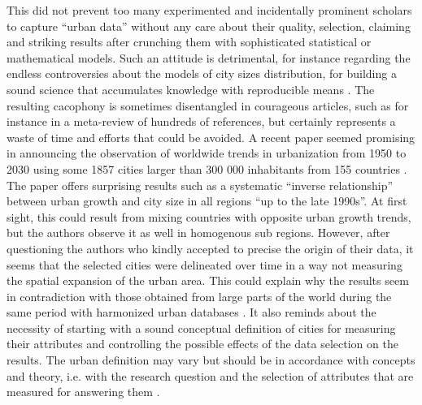 \documentclass[10pt]{article}
\begin{document}
This did not prevent too many experimented and incidentally prominent scholars to capture “urban data” without any care about their quality, selection, claiming and striking results after crunching them with sophisticated statistical or mathematical models. Such an attitude is detrimental, for instance regarding the endless controversies about the models of city sizes distribution, for building a sound science that accumulates knowledge with reproducible means \citep{pumain2012theorie}. The resulting cacophony is sometimes disentangled in courageous articles, such as for instance \citep{cottineau2017metazipf,cottineau2020metametazipf} in a meta-review of hundreds of references, but certainly represents a waste of time and efforts that could be avoided. A recent paper seemed promising in announcing the observation of worldwide trends in urbanization from 1950 to 2030 using some 1857 cities larger than 300 000 inhabitants from 155 countries \citep{egidi2020long}. The paper offers surprising results such as a systematic ``inverse relationship'' between urban growth and city size in all regions ``up to the late 1990s''. At first sight, this could result from mixing countries with opposite urban growth trends, but the authors observe it as well in homogenous sub regions. However, after questioning the authors who kindly accepted to precise the origin of their data, it seems that the selected cities were delineated over time in a way not measuring the spatial expansion of the urban area. This could explain why the results seem in contradiction with those obtained from large parts of the world during the same period with harmonized urban databases \citep{cura2017old}. It also reminds about the necessity of starting with a sound conceptual definition of cities for measuring their attributes and controlling the possible effects of the data selection on the results. The urban definition may vary but should be in accordance with concepts and theory, i.e. with the research question and the selection of attributes that are measured for answering them \citep{rozenblat2020extending}.
\end{document}
